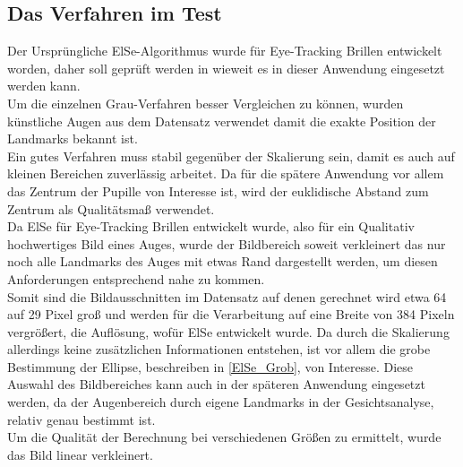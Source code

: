 \subsection{Das Verfahren im Test}
Der Ursprüngliche ElSe-Algorithmus wurde für Eye-Tracking Brillen entwickelt worden, daher soll geprüft werden in wieweit es in dieser Anwendung eingesetzt werden kann.\\
Um die einzelnen Grau-Verfahren besser Vergleichen zu können, wurden künstliche Augen aus dem Datensatz \cite{database_Eye} verwendet damit die exakte Position der Landmarks bekannt ist.\\
Ein gutes Verfahren muss stabil gegenüber der Skalierung sein, damit es auch auf kleinen Bereichen zuverlässig arbeitet. Da für die spätere Anwendung vor allem das Zentrum der Pupille von Interesse ist, wird der euklidische Abstand zum Zentrum als Qualitätsmaß verwendet.\\
Da ElSe für Eye-Tracking Brillen entwickelt wurde, also für ein Qualitativ hochwertiges Bild eines Auges, wurde der Bildbereich soweit verkleinert das nur noch alle Landmarks des Auges mit etwas Rand dargestellt werden, um diesen Anforderungen entsprechend nahe zu kommen.\\
Somit sind die Bildausschnitten im Datensatz auf denen gerechnet wird etwa 64 auf 29 Pixel groß und werden für die Verarbeitung auf eine Breite von 384 Pixeln vergrößert, die Auflösung, wofür ElSe entwickelt wurde. Da durch die Skalierung allerdings keine zusätzlichen Informationen entstehen, ist vor allem die grobe Bestimmung der Ellipse, beschreiben in \autoref{ElSe_Grob}, von Interesse. Diese Auswahl des Bildbereiches kann auch in der späteren Anwendung eingesetzt werden, da der Augenbereich durch eigene Landmarks in der Gesichtsanalyse, relativ genau bestimmt ist.\\
Um die Qualität der Berechnung bei verschiedenen Größen zu ermittelt, wurde das Bild linear verkleinert.
